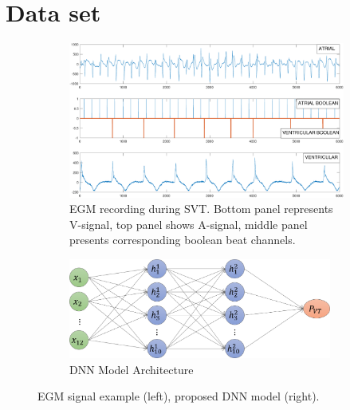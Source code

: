\section{Data set}
\label{sec:data}

\begin{figure}[t]
	\centering
	\begin{subfigure}{.5\textwidth}
		\centering
		\includegraphics[scale=0.3]{figures/atachs.pdf}
		\caption{EGM recording during SVT. Bottom panel represents 
			V-signal, top 
			panel shows A-signal, middle panel presents corresponding 
			boolean beat channels.}
		\label{fig:egm}
	\end{subfigure}%
	\begin{subfigure}{.5\textwidth}
		\centering
		\includegraphics[width=0.95\textwidth]{figures/dnn_graph.png}
		\caption{DNN Model Architecture}
		\label{fig:dnn_graph}
	\end{subfigure}
	\caption{EGM signal example (left),	proposed DNN model (right).}
	\label{fig:yes}
\end{figure}





